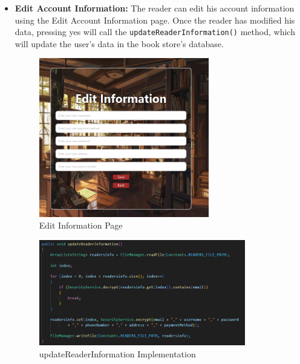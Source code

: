 \documentclass[a4paper,14pt]{extarticle}
\begin{document}
\begin{itemize}

    \item \textbf{Edit Account Information:} The reader can edit his account information using the Edit Account Information page. Once the reader has modified his data, pressing yes will call the \texttt{update\-Reader\-Information()} method, which will update the user's data in the book store's database.
    \begin{figure}[H]
        \centering
        \includegraphics[width=0.7\textwidth]{Media/Edit Information.png}
        \caption{Edit Information Page}
    \end{figure}
    \begin{figure}[H]
        \centering
        \includegraphics[width=0.85\textwidth]{Media/updateReaderInformation.png}
        \caption{updateReaderInformation Implementation}
    \end{figure}


\end{itemize}
\end{document}
